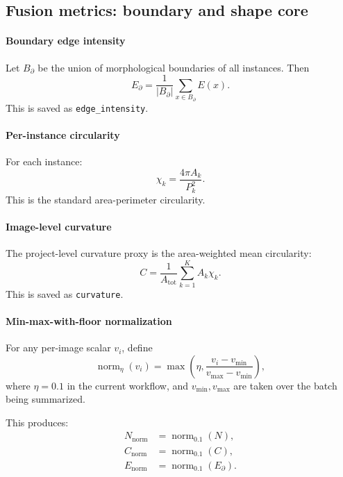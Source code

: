 \documentclass[11pt]{article}
\newcommand{\1}{\mathbf{1}}
\newcommand{\edgefield}{E}
\begin{document}
\subsection{Fusion metrics: boundary and shape core}
\paragraph{Boundary edge intensity}
Let $B_{\partial}$ be the union of morphological boundaries of all instances. Then
\begin{equation}
E_{\partial} = \frac{1}{|B_{\partial}|}\sum_{x\in B_{\partial}} \edgefield(x).
\end{equation}
This is saved as \texttt{edge\_intensity}.

\paragraph{Per-instance circularity}
For each instance:
\begin{equation}
\chi_k = \frac{4\pi A_k}{P_k^2}.
\end{equation}
This is the standard area-perimeter circularity.

\paragraph{Image-level curvature}
The project-level curvature proxy is the area-weighted mean circularity:
\begin{equation}
C = \frac{1}{A_{\mathrm{tot}}}\sum_{k=1}^{K} A_k\chi_k.
\end{equation}
This is saved as \texttt{curvature}.

\paragraph{Min-max-with-floor normalization}
For any per-image scalar $v_i$, define
\begin{equation}
\operatorname{norm}_{\eta}(v_i) = \max\left(\eta, \frac{v_i-v_{\min}}{v_{\max}-v_{\min}}\right),
\end{equation}
where $\eta=0.1$ in the current workflow, and $v_{\min},v_{\max}$ are taken over the batch being summarized.

This produces:
\begin{align}
N_{\mathrm{norm}} &= \operatorname{norm}_{0.1}(N),\\
C_{\mathrm{norm}} &= \operatorname{norm}_{0.1}(C),\\
E_{\mathrm{norm}} &= \operatorname{norm}_{0.1}(E_{\partial}).
\end{align}
\end{document}
